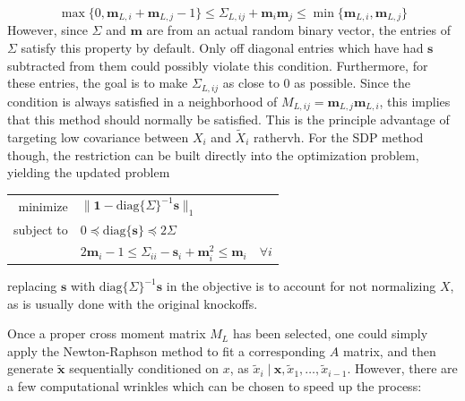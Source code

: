 \documentclass[11pt]{article}
\newcommand{\diag}[1]{\mathrm{diag}\{#1\}}
\newcommand{\st}{ \; \big | \:}
\theoremstyle{definition}
\begin{document}
        \[\max\{0,\mathbf m_{L,i} + \mathbf m_{L,j} -1\} \leq \Sigma_{L,ij} + \mathbf m_i \mathbf m_j \leq \min\{\mathbf m_{L,i}, \mathbf m_{L,j}\} \]
        However, since $\Sigma$ and $\mathbf m$ are from an actual random binary vector, the entries of $\Sigma$ satisfy this property by default. Only off diagonal entries which have had $\mathbf s$ subtracted from them could possibly violate this condition. Furthermore, for these entries, the goal is to make $\Sigma_{L,ij}$ as close to $0$ as possible. Since the condition is always satisfied in a neighborhood of $M_{L,ij} = \mathbf m_{L,j}\mathbf m_{L,i}$, this implies that this method should normally be satisfied. This is the principle advantage of targeting low covariance between $X_i$ and $\tilde X_i$ rathervh. For the SDP method though, the restriction can be built directly into the optimization problem, yielding the updated problem
            \begin{center}
                \begin{tabular}{r l}
                    minimize & $\|\mathbf 1-\diag{\Sigma}^{-1}\mathbf s\|_1$ \\
                    subject to & $ 0 \preceq \diag{\mathbf s} \preceq 2\Sigma $ \\
                               & $ 2\mathbf m_i -1 \leq \Sigma_{ii}-\mathbf s_i + \mathbf m_i^2 \leq \mathbf m_i  \quad \forall i$
                \end{tabular} 
            \end{center} 
        replacing $\mathbf s$ with $\diag{\Sigma}^{-1}\mathbf s$ in the objective is to account for not normalizing $X$, as is usually done with the original knockoffs. \par
        Once a proper cross moment matrix $M_L$ has been selected, one could simply apply the Newton-Raphson method to fit a corresponding $A$ matrix, and then generate $\mathbf{ \tilde x}$ sequentially conditioned on $x$, as $\tilde x_i \st \mathbf x,\tilde x_1,\ldots,\tilde x_{i-1}$. However, there are a few computational wrinkles which can be chosen to speed up the process:
\end{document}
